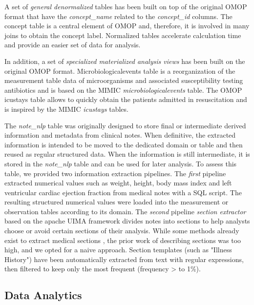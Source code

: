 A set of \emph{general denormalized} tables has been built on top of the original 
OMOP  format that have the \textit{concept\_name} related to the \textit{concept\_id} 
columns. The concept table is a central element of OMOP and, therefore, it is 
involved in many joins to obtain the concept label. Normalized tables accelerate 
calculation time and provide an easier set of data for analysis.

In addition, a set of \emph{specialized materialized analysis views} has been built 
on the original OMOP format. Microbiologicalevents table is a reorganization of the 
measurement table data of microorganisms and associated susceptibility testing 
antibiotics and is based on the MIMIC \textit{microbiologicalevents} table. 
The OMOP icustays table allows to quickly obtain the patients admitted in 
resuscitation and is inspired by the MIMIC \textit{icustays} tables.

The \textit{note\_nlp} table was originally designed to store final or intermediate 
derived information and metadata from clinical notes. When definitive, the 
extracted information is intended to be moved to the dedicated domain or table 
and then reused as regular structured data. 
When the information is still intermediate, it is stored in the \textit{note\_nlp} 
table and can be used for later analysis. 
To assess this table, we provided two information extraction pipelines. 
The \emph{first} pipeline extracted numerical values such as weight, height, 
body mass index and left ventricular cardiac ejection fraction from medical notes 
with a SQL script. The resulting structured numerical values were loaded into the 
measurement or observation tables according to its domain. 
The \emph{second} pipeline \emph{section extractor} based on the apache UIMA 
framework divides notes into sections to help analysts choose or avoid certain 
sections of their analysis. While some methods already exist to extract 
medical sections \cite{section-extraction}, the prior work of describing sections 
was too high, and we opted for a naive approach. Section templates (such as 
"Illness History") have been automatically extracted from text with regular 
expressions, then filtered to keep only the most frequent (frequency > to 1\%). 

%
%
\subsection{Data Analytics}


